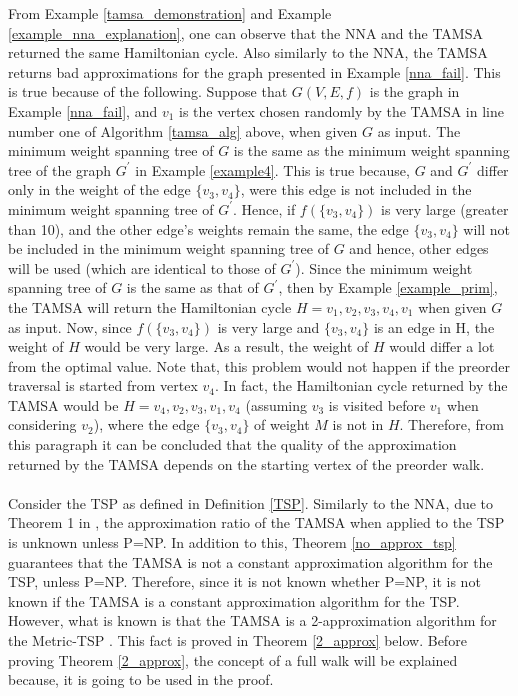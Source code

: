 \documentclass[12pt]{article}
\numberwithin{equation}{subsection}
\numberwithin{table}{subsection}
\numberwithin{algorithm}{subsection}
\numberwithin{figure}{subsection}
\begin{document}
From Example \ref{tamsa_demonstration} and Example \ref{example_nna_explanation}, one can observe that the NNA and the TAMSA returned the same Hamiltonian cycle. Also similarly to the NNA, the TAMSA returns bad approximations for the graph presented in Example \ref{nna_fail}. This is true because of the following. Suppose that $G(V,E,f)$ is the graph in Example \ref{nna_fail}, and $v_1$ is the vertex chosen randomly by the TAMSA in line number one of Algorithm \ref{tamsa_alg} above, when given $G$ as input. The minimum weight spanning tree of $G$ is the same as the minimum weight spanning tree of the graph $G^\prime$ in Example \ref{example4}. This is true because, $G$ and $G^\prime$ differ only in the weight of the edge $\{v_3, v_4\}$, were this edge is not included in the minimum weight spanning tree of $G^\prime$. Hence, if $f(\{v_3, v_4\})$ is very large (greater than 10), and the other edge's weights remain the same, the edge $\{v_3, v_4\}$ will not be included in the minimum weight spanning tree of $G$ and hence, other edges will be used (which are identical to those of $G^\prime$). Since the minimum weight spanning tree of $G$ is the same as that of $G^\prime$, then by Example \ref{example_prim}, the TAMSA will return the Hamiltonian cycle $ H = v_1, v_2, v_3, v_4, v_1$ when given $G$ as input. Now, since $f(\{v_3, v_4\})$ is very large and $\{v_3, v_4\}$ is an edge in H, the weight of $H$ would be very large. As a result, the weight of $H$ would differ a lot from the optimal value. Note that, this problem would not happen if the preorder traversal is started from vertex $v_4$. In fact, the Hamiltonian cycle returned by the TAMSA would be $H = v_4, v_2, v_3, v_1, v_4$ (assuming $v_3$ is visited before $v_1$ when considering $v_2$), where the edge $\{v_3, v_4\}$ of weight $M$ is not in $H$. Therefore, from this paragraph it can be concluded that the quality of the approximation returned by the TAMSA depends on the starting vertex of the preorder walk.\\\\
Consider the TSP as defined in Definition \ref{TSP}. Similarly to the NNA, due to Theorem 1 in \cite{chekuri_im_2011}, the approximation ratio of the TAMSA when applied to the TSP is unknown unless P=NP. In addition to this, Theorem \ref{no_approx_tsp} guarantees that the TAMSA is not a constant approximation algorithm for the TSP, unless P=NP. Therefore, since it is not known whether P=NP, it is not known if the TAMSA is a constant approximation algorithm for the TSP. However, what is known is that the TAMSA is a 2-approximation algorithm for the Metric-TSP \cite{cormen_leiserson_rivest_stein}. This fact is proved in Theorem \ref{2_approx} below. Before proving Theorem \ref{2_approx}, the concept of a full walk will be explained because, it is going to be used in the proof.\\\\
\end{document}
